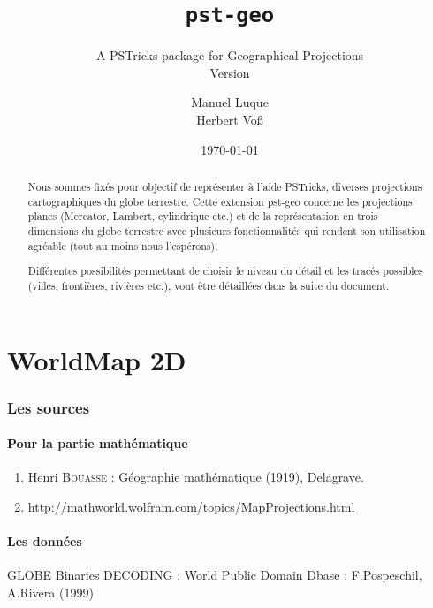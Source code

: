\documentclass[11pt,french,BCOR10mm,DIV12,bibliography=totoc,parskip=false,
   smallheadings, headexclude,footexclude,oneside]{pst-doc}
\let\GeoFileVersion\fileversion
\newcommand\PstMapTwoDPackage{\textsf{pst-geo}}
\begin{document}
\title{\texttt{pst-geo}}
\subtitle{A PSTricks package for Geographical Projections\\Version \GeoFileVersion}
\author{Manuel Luque \\ Herbert Voß}
\docauthor{}
\date{\today}

\maketitle

\part{WorldMap 2D}



 \begin{abstract}
 Nous sommes fix\'es pour objectif de repr\'esenter à l'aide PSTricks, diverses
 projections cartographiques du globe terrestre. Cette extension \PstMapTwoDPackage{} concerne
 les projections planes (Mercator, Lambert, cylindrique etc.) et 
 de la repr\'esentation en trois dimensions
 du globe terrestre avec plusieurs fonctionnalit\'es qui rendent son
 utilisation agr\'eable (tout au moins nous l'esp\'erons).

 Diff\'erentes possibilit\'es  permettant de choisir le niveau du
 d\'etail et les trac\'es possibles (villes, fronti\`eres, rivi\`eres etc.), vont
 \^etre d\'etaill\'ees dans la suite du document.
 \end{abstract}

\tableofcontents

\section{Les sources\label{sources}}
\subsection{Pour la partie math\'ematique}

\begin{enumerate}
  \item Henri \textsc{Bouasse} : G\'eographie math\'ematique (1919), Delagrave.
  \item \url{http://mathworld.wolfram.com/topics/MapProjections.html}
\end{enumerate}
\subsection{Les donn\'ees}
GLOBE Binaries DECODING : World Public Domain Dbase :
 F.Pospeschil, A.Rivera (1999)
\end{document}
